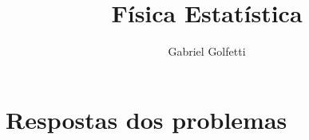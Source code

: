 \documentclass[a4paper, 12pt]{article}
\title{Física Estatística}
\author{Gabriel Golfetti}
\date{}
\newcommand\problemanswers{}
\theoremstyle{definition}
\theoremstyle{definition}
\begin{document}
\maketitle
\tableofcontents






\appendix


%

\section{Respostas dos problemas}

\renewcommand{\do}[1]{\noindent\par #1}
\dolistloop{\problemanswers}
\end{document}

